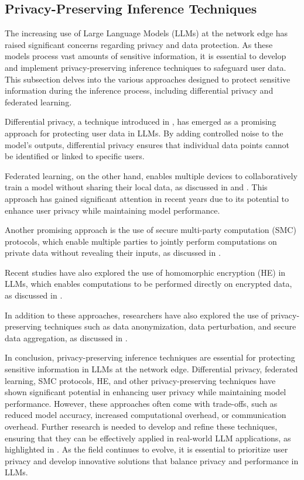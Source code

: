 \documentclass[11pt,a4paper]{article}
\begin{document}
\subsection{Privacy-Preserving Inference Techniques}


The increasing use of Large Language Models (LLMs) at the network edge has raised significant concerns regarding privacy and data protection. As these models process vast amounts of sensitive information, it is essential to develop and implement privacy-preserving inference techniques to safeguard user data. This subsection delves into the various approaches designed to protect sensitive information during the inference process, including differential privacy and federated learning.

Differential privacy, a technique introduced in \cite{doi:10.1109/icassp.2019.8683351}, has emerged as a promising approach for protecting user data in LLMs. By adding controlled noise to the model's outputs, differential privacy ensures that individual data points cannot be identified or linked to specific users. 

Federated learning, on the other hand, enables multiple devices to collaboratively train a model without sharing their local data, as discussed in \cite{doi:10.18653/v1/2022.emnlp-main.804} and \cite{arxiv:2507.11181}. This approach has gained significant attention in recent years due to its potential to enhance user privacy while maintaining model performance. 

Another promising approach is the use of secure multi-party computation (SMC) protocols, which enable multiple parties to jointly perform computations on private data without revealing their inputs, as discussed in \cite{doi:10.1145/3336191.3371829}. 

Recent studies have also explored the use of homomorphic encryption (HE) in LLMs, which enables computations to be performed directly on encrypted data, as discussed in \cite{doi:10.1080/01621459.2017.1341413}. 

In addition to these approaches, researchers have also explored the use of privacy-preserving techniques such as data anonymization, data perturbation, and secure data aggregation, as discussed in \cite{arxiv:2204.03326}. 

In conclusion, privacy-preserving inference techniques are essential for protecting sensitive information in LLMs at the network edge. Differential privacy, federated learning, SMC protocols, HE, and other privacy-preserving techniques have shown significant potential in enhancing user privacy while maintaining model performance. However, these approaches often come with trade-offs, such as reduced model accuracy, increased computational overhead, or communication overhead. Further research is needed to develop and refine these techniques, ensuring that they can be effectively applied in real-world LLM applications, as highlighted in \cite{doi:10.1109/comst.2025.3527641}. As the field continues to evolve, it is essential to prioritize user privacy and develop innovative solutions that balance privacy and performance in LLMs.
\end{document}
